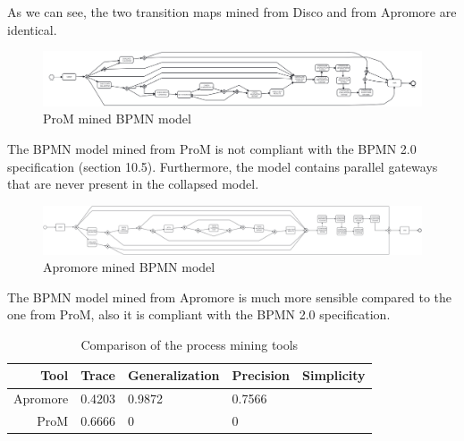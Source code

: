 As we can see, the two transition maps mined from Disco and from 
Apromore are identical.

\begin{figure}[H]
\centering
\includegraphics[width=\textwidth]{figures/prom_mined.png}
\caption{ProM mined BPMN model}
\label{fig:prom_mined}
\end{figure}

The BPMN model mined from ProM is not compliant with the BPMN 2.0 specification
(section 10.5). Furthermore, the model contains parallel gateways that are never present
in the collapsed model.

\begin{figure}[H]
\centering
\includegraphics[width=\textwidth]{figures/apromore_mined.png}
\caption{Apromore mined BPMN model}
\label{fig:apromore_mined}
\end{figure}

The BPMN model mined from Apromore is much more sensible compared to the one from ProM, also
it is compliant with the BPMN 2.0 specification.

\begin{table}[H]
\centering
\begin{tabular}{|r|l|l|l|l|}
\hline
\textbf{Tool} & \textbf{Trace} & \textbf{Generalization} & \textbf{Precision} & \textbf{Simplicity} \\
\hline
Apromore & 0.4203 & 0.9872 & 0.7566 & \\
\hline
ProM & 0.6666 & 0 & 0 & \\
\hline
\end{tabular}
\caption{Comparison of the process mining tools}
\label{tab:process_mining_comparison}
\end{table}
